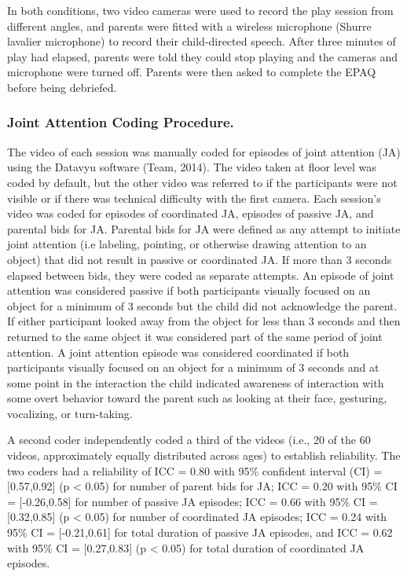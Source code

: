 \documentclass[]{article}
\begin{document}
In both conditions, two video cameras were used to record the play
session from different angles, and parents were fitted with a wireless
microphone (Shurre lavalier microphone) to record their child-directed
speech. After three minutes of play had elapsed, parents were told they
could stop playing and the cameras and microphone were turned off.
Parents were then asked to complete the EPAQ before being debriefed.

\hypertarget{joint-attention-coding-procedure.}{%
\subsubsection{Joint Attention Coding
Procedure.}\label{joint-attention-coding-procedure.}}

The video of each session was manually coded for episodes of joint
attention (JA) using the Datavyu software (Team, 2014). The video taken
at floor level was coded by default, but the other video was referred to
if the participants were not visible or if there was technical
difficulty with the first camera. Each session's video was coded for
episodes of coordinated JA, episodes of passive JA, and parental bids
for JA. Parental bids for JA were defined as any attempt to initiate
joint attention (i.e labeling, pointing, or otherwise drawing attention
to an object) that did not result in passive or coordinated JA. If more
than 3 seconds elapsed between bids, they were coded as separate
attempts. An episode of joint attention was considered passive if both
participants visually focused on an object for a minimum of 3 seconds
but the child did not acknowledge the parent. If either participant
looked away from the object for less than 3 seconds and then returned to
the same object it was considered part of the same period of joint
attention. A joint attention episode was considered coordinated if both
participants visually focused on an object for a minimum of 3 seconds
and at some point in the interaction the child indicated awareness of
interaction with some overt behavior toward the parent such as looking
at their face, gesturing, vocalizing, or turn-taking.

A second coder independently coded a third of the videos (i.e., 20 of
the 60 videos, approximately equally distributed across ages) to
establish reliability. The two coders had a reliability of ICC = 0.80
with 95\% confident interval (CI) = {[}0.57,0.92{]} (p \textless{} 0.05)
for number of parent bids for JA; ICC = 0.20 with 95\% CI =
{[}-0.26,0.58{]} for number of passive JA episodes; ICC = 0.66 with 95\%
CI = {[}0.32,0.85{]} (p \textless{} 0.05) for number of coordinated JA
episodes; ICC = 0.24 with 95\% CI = {[}-0.21,0.61{]} for total duration
of passive JA episodes, and ICC = 0.62 with 95\% CI = {[}0.27,0.83{]} (p
\textless{} 0.05) for total duration of coordinated JA episodes.
\end{document}
